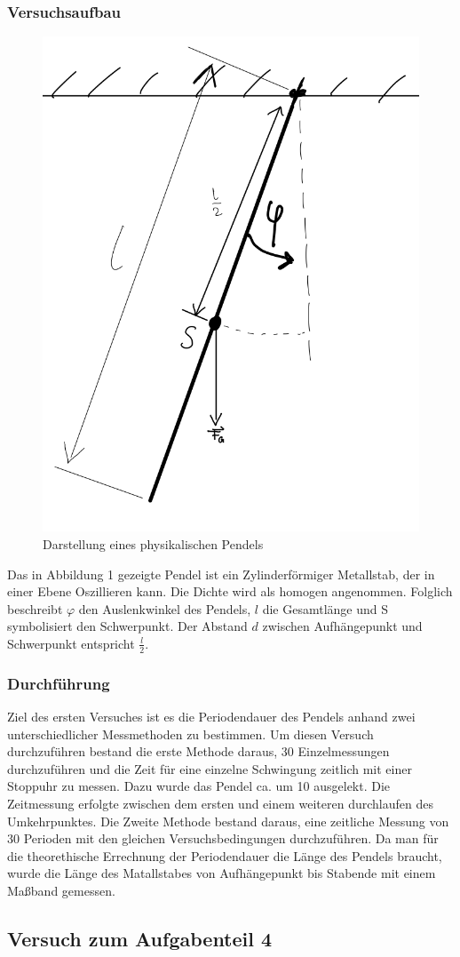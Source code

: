 \documentclass[11pt,a4paper]{article}
\begin{document}
      \subsubsection{Versuchsaufbau}
      \begin{figure}[h]
      	\includegraphics[width=0.4\linewidth]{physikalisches Pendel.png}
      	\centering
      	\caption{Darstellung eines physikalischen Pendels}
      \end{figure}
Das in Abbildung 1 gezeigte Pendel  ist ein Zylinderförmiger Metallstab, der in einer Ebene Oszillieren kann. Die Dichte wird als homogen angenommen. Folglich beschreibt $\varphi$  den Auslenkwinkel des Pendels, $l$ die Gesamtlänge und S symbolisiert den Schwerpunkt. Der Abstand $d$ zwischen Aufhängepunkt und Schwerpunkt entspricht $\frac{l}{2}$.
      \subsubsection{Durchführung}
Ziel des ersten Versuches ist es die Periodendauer des Pendels anhand zwei unterschiedlicher Messmethoden zu bestimmen.
 Um diesen Versuch durchzuführen bestand die erste Methode daraus, 30 Einzelmessungen durchzuführen und die Zeit für eine einzelne Schwingung zeitlich mit einer Stoppuhr zu messen.
  Dazu wurde das Pendel ca. um 10 ausgelekt. Die Zeitmessung erfolgte zwischen dem ersten und einem 
  weiteren durchlaufen des Umkehrpunktes.
   Die Zweite Methode bestand daraus, eine zeitliche Messung von 30 Perioden mit den gleichen Versuchsbedingungen durchzuführen.
    Da man für die theorethische Errechnung der Periodendauer die Länge des Pendels braucht, wurde die Länge des Matallstabes von Aufhängepunkt bis Stabende mit einem Maßband gemessen.
\subsection{Versuch zum Aufgabenteil 4}
\end{document}
